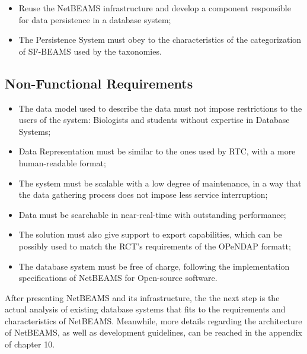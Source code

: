 \begin{itemize}
  \item Reuse the NetBEAMS infrastructure and develop a component responsible
  for data persistence in a database system;
  \item The Persistence System must obey to the characteristics of the
  categorization of SF-BEAMS used by the taxonomies.
\end{itemize}

\subsection{Non-Functional Requirements}

\begin{itemize}
  \item The data model used to describe the data must not impose restrictions
  to the users of the system: Biologists and students without expertise in
  Database Systems;
  \item Data Representation must be similar to the ones used by RTC, with a
  more human-readable format;
  \item The system must be scalable with a low degree of maintenance, in a
  way that the data gathering process does not impose less service interruption;
  \item Data must be searchable in near-real-time with outstanding performance;
  \item The solution must also give support to export capabilities, which can
  be possibly used to match the RCT's requirements of the OPeNDAP formatt;
  \item The database system must be free of charge, following the
  implementation specifications of NetBEAMS for Open-source software.
\end{itemize}

After presenting NetBEAMS and its infrastructure, the the next step is the
actual analysis of existing database systems that fits to the requirements
and characteristics of NetBEAMS. Meanwhile, more details regarding the
architecture of NetBEAMS, as well as development guidelines, can be reached in
the appendix of chapter 10.
